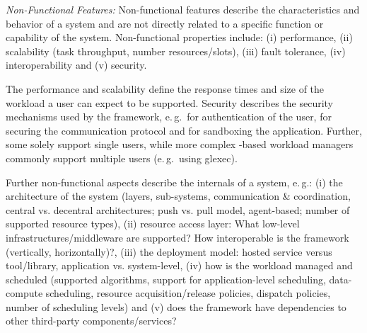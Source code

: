 \documentclass{sig-alternate}
\begin{document}

\emph{Non-Functional Features:} Non-functional features describe the 
characteristics and behavior of a
\pilotjob system and are not directly related to a specific function or
capability of the \pilotjob system. Non-functional properties include: (i)
performance, (ii) scalability (task throughput, number resources/slots), (iii)
fault tolerance, (iv) interoperability and (v) security.

The performance and scalability define the response times and size of the
workload a user can expect to be supported. Security describes the security
mechanisms used by the framework, e.\,g.\ for authentication of the user, for
securing the communication protocol and for sandboxing the application.
Further, some \pilotjobs solely support single users, while more complex
\pilot-based workload managers commonly support multiple users (e.\,g.\ using
glexec).

Further non-functional aspects describe the internals of a \pilotjob system, 
e.\,g.: (i) the architecture of the system (layers, sub-systems,
communication \& coordination, central vs. decentral architectures; push vs.
pull model, agent-based; number of supported resource types), (ii) resource
access layer: What low-level infrastructures/middleware are supported? How
interoperable is the framework (vertically, horizontally)?, (iii) the
deployment model: hosted service versus tool/library, application vs.
system-level, (iv) how is the workload managed and scheduled (supported
algorithms, support for application-level scheduling, data-compute scheduling,
resource acquisition/release policies, dispatch policies, number of scheduling
levels) and (v) does the framework have dependencies to other third-party
components/services?
\end{document}
